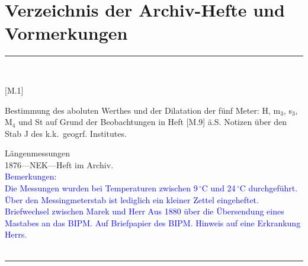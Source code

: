 

\chapter{Verzeichnis der Archiv-Hefte und Vormerkungen}
\parbox{\textwidth}{%
\rule{\textwidth}{1pt}\vspace*{-3mm}\\
\begin{minipage}[t]{0.2\textwidth}\vspace{0pt}
\Huge\rule[-4mm]{0cm}{1cm}[M.1]
\end{minipage}
\hfill
\begin{minipage}[t]{0.8\textwidth}\vspace{0pt}
\large Bestimmung des aboluten Werthes und der Dilatation der fünf Meter: H, m$_\mathrm{3}$, s$_\mathrm{3}$, M$_\mathrm{4}$ und St auf Grund der Beobachtungen in Heft [M.9] ä.S. Notizen über den Stab {\glqq}J{\grqq} des k.k.\ geogrf. Institutes.\rule[-2mm]{0mm}{2mm}
\end{minipage}
{\footnotesize\flushright
Längenmessungen\\
}
1876\quad---\quad NEK\quad---\quad Heft im Archiv.\\
\textcolor{blue}{Bemerkungen:\\{}
Die Messungen wurden bei Temperaturen zwischen 9\,{$^\circ$}C und 24\,{$^\circ$}C durchgeführt.\\{}
Über den Messingmeterstab ist lediglich ein kleiner Zettel eingeheftet.\\{}
Briefwechsel zwischen Marek und Herr Aus 1880 über die Übersendung eines Mastabes an das BIPM. Auf Briefpapier des BIPM. Hinweis auf eine Erkrankung Herrs.\\{}
}
\\[-15pt]
\rule{\textwidth}{1pt}
}
\\
\vspace*{-2.5pt}\\
